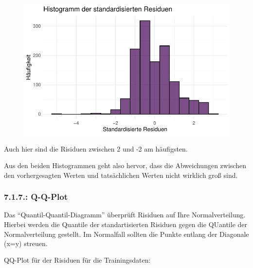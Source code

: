 \documentclass[
  letterpaper,
  DIV=11,
  numbers=noendperiod]{scrartcl}
\begin{document}
\begin{figure}[H]

{\centering \includegraphics{main_doc_files/figure-pdf/unnamed-chunk-120-1.pdf}

}

\end{figure}

Auch hier sind die Risiduen zwischen 2 und -2 am häufigsten.

Aus den beiden Histogrammen geht also hervor, dass die Abweichungen
zwischen den vorhergesagten Werten und tatsächlichen Werten nicht
wirklich groß sind.

\hypertarget{q-q-plot}{%
\subsubsection{7.1.7.: Q-Q-Plot}\label{q-q-plot}}

Das ``Quantil-Quantil-Diagramm'' überprüft Risiduen auf Ihre
Normalverteilung. Hierbei werden die Quantile der standartisierten
Risiduen gegen die QUantile der Normalverteilung gestellt. Im Normalfall
sollten die Punkte entlang der Diagonale (x=y) streuen.

QQ-Plot für der Risiduen für die Trainingsdaten:
\end{document}
